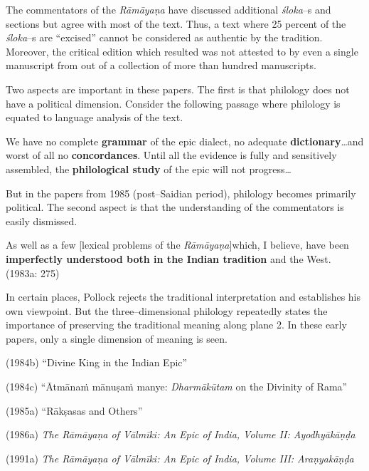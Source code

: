 The commentators of the \textit{Rāmāyaṇa }have discussed additional \textit{śloka}–s and sections but agree with most of the text. Thus, a text where 25 percent of the \textit{śloka}–s are “excised” cannot be considered as authentic by the tradition. Moreover, the critical edition which resulted was not attested to by even a single manuscript from out of a collection of more than hundred manuscripts.

Two aspects are important in these papers. The first is that philology does not have a political dimension. Consider the following passage where philology is equated to language analysis of the text.

\begin{myquote}
We have no complete \textbf{grammar} of the epic dialect, no adequate \textbf{dictionary}…and worst of all no \textbf{concordances}. Until all the evidence is fully and sensitively assembled, the \textbf{philological study} of the epic will not progress…
\end{myquote}

But in the papers from 1985 (post–Saidian period), philology becomes primarily political. The second aspect is that the understanding of the commentators is easily dismissed.

\begin{myquote}
As well as a few [lexical problems of the \textit{Rāmāyaṇa}]which, I believe, have been \textbf{imperfectly understood both in the Indian tradition} and the West. (1983a: 275)
\end{myquote}

In certain places, Pollock rejects the traditional interpretation and establishes his own viewpoint. But the three–dimensional philology repeatedly states the importance of preserving the traditional meaning along plane 2. In these early papers, only a single dimension of meaning is seen.

\item (1984b) “Divine King in the Indian Epic”

 \item (1984c) “Ātmānaṁ mānuṣaṁ manye: \textit{Dharmākūtam} on the Divinity of Rama”

 \item (1985a) “Rākṣasas and Others”

 \item (1986a)\textit{ The Rāmāyaṇa of Vālmīki: An Epic of India, Volume II: Ayodhyākāṇḍa }

 \item (1991a)\textit{ The Rāmāyaṇa of Vālmīki: An Epic of India, Volume III: Araṇyakāṇḍa }

